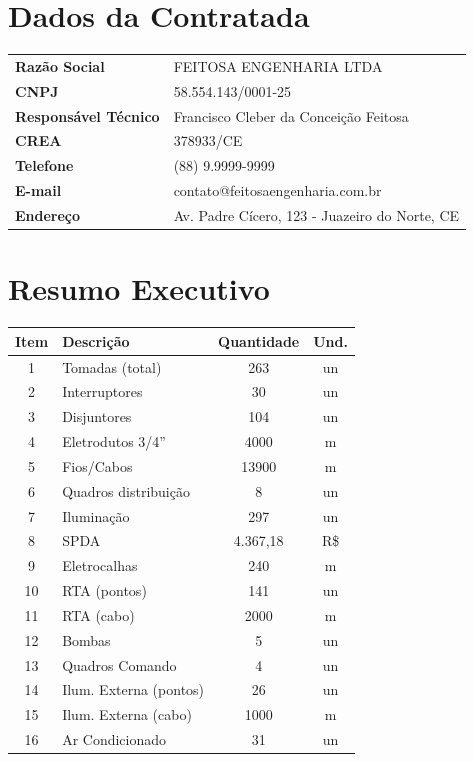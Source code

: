 \documentclass[12pt,a4paper]{article}
\renewenvironment{table}%
{\begin{center}%
\scriptsize%
\addtolength{\tabcolsep}{-2pt}%
}%
{\end{center}}
\begin{document}
\section{Dados da Contratada}

\begin{table}
\centering
\begin{tabular}{lp{10cm}}
\toprule
\textbf{Razão Social} & FEITOSA ENGENHARIA LTDA \\
\textbf{CNPJ} & 58.554.143/0001-25 \\
\textbf{Responsável Técnico} & Francisco Cleber da Conceição Feitosa \\
\textbf{CREA} & 378933/CE \\
\textbf{Telefone} & (88) 9.9999-9999 \\
\textbf{E-mail} & contato@feitosaengenharia.com.br \\
\textbf{Endereço} & Av. Padre Cícero, 123 - Juazeiro do Norte, CE \\
\bottomrule
\end{tabular}
\end{table}

\vspace{1cm}

\section{Resumo Executivo}

\begin{table}
\centering
\begin{tabular}{clcc}
\toprule
\textbf{Item} & \textbf{Descrição} & \textbf{Quantidade} & \textbf{Und.} \\
\midrule
1 & Tomadas (total) & 263 & un \\
2 & Interruptores & 30 & un \\
3 & Disjuntores & 104 & un \\
4 & Eletrodutos 3/4'' & 4000 & m \\
5 & Fios/Cabos & 13900 & m \\
6 & Quadros distribuição & 8 & un \\
7 & Iluminação & 297 & un \\
8 & SPDA & 4.367,18 & R\$ \\
9 & Eletrocalhas & 240 & m \\
10 & RTA (pontos) & 141 & un \\
11 & RTA (cabo) & 2000 & m \\
12 & Bombas & 5 & un \\
13 & Quadros Comando & 4 & un \\
14 & Ilum. Externa (pontos) & 26 & un \\
15 & Ilum. Externa (cabo) & 1000 & m \\
16 & Ar Condicionado & 31 & un \\
\bottomrule
\end{tabular}
\end{table}
\end{document}
